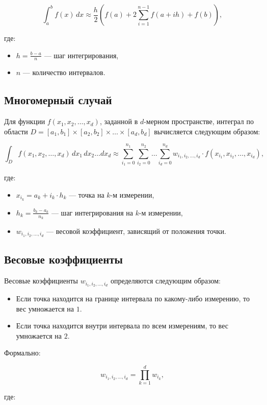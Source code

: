\documentclass{article}
\begin{document}
\[
\int_a^b f(x) \, dx \approx \frac{h}{2} \left( f(a) + 2 \sum_{i=1}^{n-1} f(a + i h) + f(b) \right),
\]

где:
\begin{itemize}
    \item \( h = \frac{b - a}{n} \) — шаг интегрирования,
    \item \( n \) — количество интервалов.
\end{itemize}

\subsection*{Многомерный случай}
Для функции \( f(x_1, x_2, \dots, x_d) \), заданной в \( d \)-мерном пространстве, интеграл по области \( D = [a_1, b_1] \times [a_2, b_2] \times \dots \times [a_d, b_d] \) вычисляется следующим образом:

\[
\int_D f(x_1, x_2, \dots, x_d) \, dx_1 \, dx_2 \dots dx_d \approx \sum_{i_1=0}^{n_1} \sum_{i_2=0}^{n_2} \dots \sum_{i_d=0}^{n_d} w_{i_1, i_2, \dots, i_d} \cdot f(x_{i_1}, x_{i_2}, \dots, x_{i_d}),
\]

где:
\begin{itemize}
    \item \( x_{i_k} = a_k + i_k \cdot h_k \) — точка на \( k \)-м измерении,
    \item \( h_k = \frac{b_k - a_k}{n_k} \) — шаг интегрирования на \( k \)-м измерении,
    \item \( w_{i_1, i_2, \dots, i_d} \) — весовой коэффициент, зависящий от положения точки.
\end{itemize}

\subsection*{Весовые коэффициенты}
Весовые коэффициенты \( w_{i_1, i_2, \dots, i_d} \) определяются следующим образом:
\begin{itemize}
    \item Если точка находится на границе интервала по какому-либо измерению, то вес умножается на \( 1 \).
    \item Если точка находится внутри интервала по всем измерениям, то вес умножается на \( 2 \).
\end{itemize}

Формально:

\[
w_{i_1, i_2, \dots, i_d} = \prod_{k=1}^d w_{i_k},
\]

где:
\end{document}
